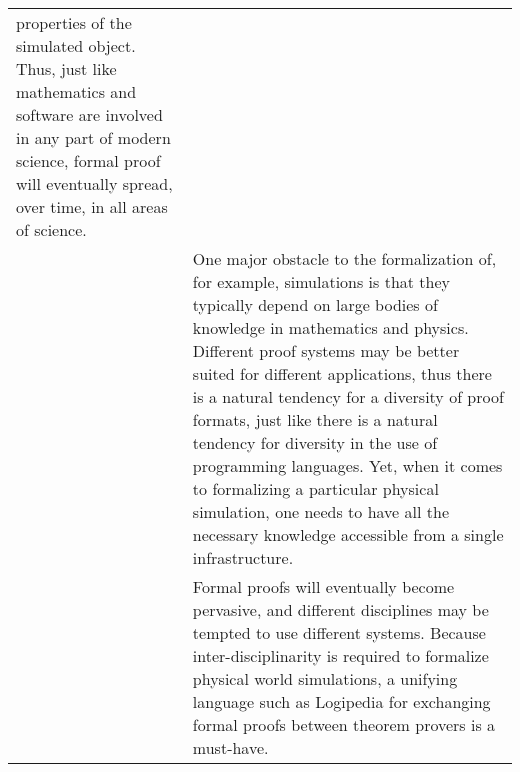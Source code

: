 \begin{longtable}{|p{}|p{}|}
properties of the simulated object.  Thus, just like mathematics and
software are involved in any part of modern science, formal proof will
eventually spread, over time, in all areas of science.\\
&
\hspace{0.4cm}
One major obstacle to the formalization of, for example, simulations
is that they typically depend on large bodies of knowledge in
mathematics and physics.  Different proof systems may be better
suited for different applications, thus there is a natural tendency
for a diversity of proof formats, just like there is a natural
tendency for diversity in the use of programming languages.  Yet, when
it comes to formalizing a particular physical simulation, one needs to
have all the necessary knowledge accessible from a single infrastructure.\\
&
\hspace{0.4cm}
Formal proofs will eventually become pervasive, and
different disciplines may be tempted to use different systems.
Because inter-disciplinarity is required to formalize physical world
simulations, a unifying language such as Logipedia for exchanging
formal proofs between theorem provers is a must-have.\\
\hline
\end{longtable}


